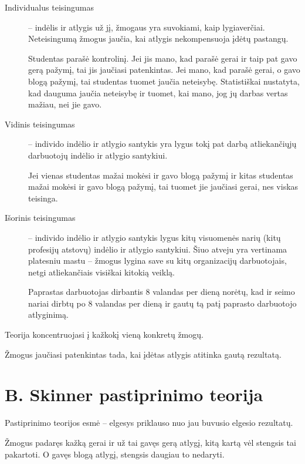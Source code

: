 \begin{description}
  \item[Individualus teisingumas] – indėlis ir atlygis už jį, žmogaus
    yra suvokiami, kaip lygiaverčiai. Neteisingumą žmogus jaučia,
    kai atlygis nekompensuoja įdėtų pastangų.
    \begin{exmp}
      Studentas parašė kontrolinį. Jei jis mano, kad parašė gerai ir
      taip pat gavo gerą pažymį, tai jis jaučiasi patenkintas. Jei
      mano, kad parašė gerai, o gavo blogą pažymį, tai studentas tuomet
      jaučia neteisybę. Statistiškai nustatyta, kad dauguma jaučia
      neteisybę ir tuomet, kai mano, jog jų darbas vertas mažiau, nei
      jie gavo.
    \end{exmp}
  \item[Vidinis teisingumas] – individo indėlio ir atlygio santykis yra
    lygus tokį pat darbą atliekančiųjų darbuotojų indėlio ir atlygio
    santykiui.
    \begin{exmp}
      Jei vienas studentas mažai mokėsi ir gavo blogą
      pažymį ir kitas studentas mažai mokėsi ir gavo blogą pažymį, tai
      tuomet jie jaučiasi gerai, nes viskas teisinga.
    \end{exmp}
  \item[Išorinis teisingumas] – individo indėlio ir atlygio santykis
    lygus kitų visuomenės narių (kitų profesijų atstovų) indėlio
    ir atlygio santykiui. Šiuo atveju yra vertinama platesniu mastu
    – žmogus lygina save su kitų organizacijų darbuotojais, netgi
    atliekančiais visiškai kitokią veiklą.
    \begin{exmp}
      Paprastas darbuotojas dirbantis 8 valandas per dieną norėtų, kad
      ir seimo nariai dirbtų po 8 valandas per dieną ir gautų tą patį
      paprasto darbuotojo atlyginimą.
    \end{exmp}
\end{description}

Teorija koncentruojasi į kažkokį vieną konkretų žmogų.

Žmogus jaučiasi patenkintas tada, kai įdėtas atlygis atitinka gautą
rezultatą.

\section{B. Skinner pastiprinimo teorija}

Pastiprinimo teorijos esmė – elgesys priklauso nuo jau buvusio elgesio
rezultatų.

\begin{exmp}
  Žmogus padaręs kažką gerai ir už tai gavęs gerą atlygį, kitą kartą
  vėl stengsis tai pakartoti. O gavęs blogą atlygį, stengsis daugiau
  to nedaryti.
\end{exmp}

